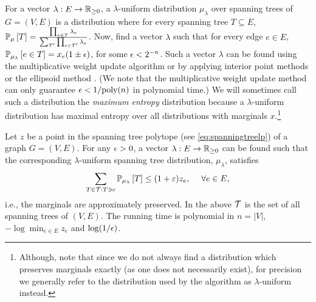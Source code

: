 For a vector $\lambda:E\to\mathbb{R}_{\geq 0}$, a $\lambda$-uniform distribution $\mu_\lambda$ over spanning trees of $G=(V,E)$ is a distribution where for every spanning tree $T\subseteq E$, ${\mathbb{P}}_{\mu}\left[T\right]=\frac{\prod_{e\in T} \lambda_e}{\sum_{T'} \prod_{e\in T'} \lambda_e}$.
Now, find a vector $\lambda$ such that for every edge $e\in E$, ${\mathbb{P}}_{\mu_\lambda}\left[e\in T\right]=x_e(1\pm{\epsilon})$, for some ${\epsilon}<2^{-n}$. Such a vector $\lambda$ can be found using the multiplicative weight update algorithm \cite{AGMOS10} or by applying interior point methods \cite{SV19} or the ellipsoid method \cite{AGMOS10}. (We note that the multiplicative weight update method can only guarantee ${\epsilon}<1/\text{poly}(n)$ in polynomial time.) We will sometimes call such a distribution the \textit{maximum entropy} distribution because a $\lambda$-uniform distribution has maximal entropy over all distributions with marginals $x$.\footnote{Although, note that since we do not always find a distribution which preserves marginals exactly (as one does not necessarily exist), for precision we generally refer to the distribution used by the algorithm as $\lambda$-uniform instead.} 
\begin{theorem}
\label{thm:maxentropycomp}
Let $z$ be a point in the spanning tree polytope (see \eqref{eq:spanningtreelp}) of a graph $ G=(V, E)$.
For any ${\epsilon}>0$, a vector $\lambda:E\to\mathbb{R}_{\geq 0}$ can be found such that the corresponding $\lambda$-uniform spanning tree distribution, $\mu_\lambda$, satisfies
$$%
\sum_{T\in {\cal T}: T \ni e} \PP{\mu_\lambda}{T}  \leq (1+\varepsilon)z_e,\hspace{3ex}\forall e\in E,$$
i.e., the marginals are approximately preserved.  In the above ${\cal T}$ is the set of all spanning trees of $(V,E)$. The running
time is polynomial in $n=|V|$, $- \log \min_{e\in E} z_e$ and $\log(1/{\epsilon})$.
\end{theorem}

